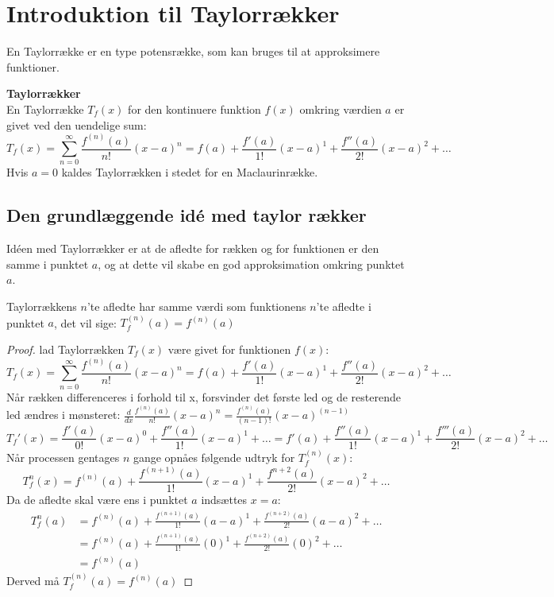 \chapter{Introduktion til Taylorrækker}
\label{ch:tr}
En Taylorrække er en type potensrække, som kan bruges til at approksimere funktioner.
\begin{defn}
    \textbf{Taylorrækker}\\
    En Taylorrække $T_f(x)$ for den kontinuere funktion $f(x)$ omkring værdien $a$ er givet ved den uendelige sum:
    \[
        T_f(x) = \sum^{\infty}_{n=0} \frac{f^{(n)}(a)}{n!} (x-a)^{n}
        = f(a) + \frac{f'(a)}{1!}(x-a)^{1} + \frac{f''(a)}{2!}(x-a)^{2} + \ldots
    \]
    Hvis $a = 0$ kaldes Taylorrækken i stedet for en Maclaurinrække.
\end{defn}
\section{Den grundlæggende idé med taylor rækker}
\label{def:taylorrække} Idéen med Taylorrækker er at de afledte for rækken og for funktionen er den samme i punktet $a$, 
og at dette vil skabe en god approksimation omkring punktet $a$. 
\begin{thm}
    Taylorrækkens $n$'te afledte har samme værdi som funktionens $n$'te afledte i punktet $a$, 
    det vil sige: $T_f^{(n)}(a) = f^{(n)} (a)$
\end{thm}
\begin{proof}
    lad Taylorrækken $T_f(x)$ være givet for funktionen $f(x)$: 
    \[
        T_f(x) = \sum^{\infty}_{n=0} \frac{f^{(n)}(a)}{n!} (x-a)^{n}
        = f(a) + \frac{f'(a)}{1!}(x-a)^{1} + \frac{f''(a)}{2!}(x-a)^{2} + \ldots
    \]
    Når rækken differenceres i forhold til x, forsvinder det første led og de resterende led ændres i mønsteret: $\frac{d}{dx} \frac{f^{(n)}(a)}{n!} (x-a)^{n} = \frac{f^{(n)}(a)}{(n-1)!} (x-a)^{(n - 1)}$ %
    \[
        T_f'(x) = \frac{f'(a)}{0!}(x-a)^0 + \frac{f''(a)}{1!}(x-a)^{1} + \ldots = f'(a) + \frac{f''(a)}{1!}(x-a)^{1} + \frac{f'''(a)}{2!}(x-a)^{2} + \ldots
    \]
    Når processen gentages $n$ gange opnåes følgende udtryk for $T_f^{(n)}(x)$:
    \[
        T_f^{n}(x) = f^{(n)}(a) + \frac{f^{(n + 1)}(a)}{1!}(x-a)^{1} + \frac{f^{n + 2}(a)}{2!}(x-a)^{2} + \ldots
    \]
    Da de afledte skal være ens i punktet $a$ indsættes $x = a$:
    \begin{align*}
        T_f^{n}(a) &= f^{(n)}(a) + \frac{f^{(n + 1)}(a)}{1!}(a-a)^{1} + \frac{f^{(n + 2)}(a)}{2!}(a-a)^{2} + \ldots \\
                   &= f^{(n)}(a) + \frac{f^{(n + 1)}(a)}{1!}(0)^{1} + \frac{f^{(n + 2)}(a)}{2!}(0)^{2} + \ldots \\
                   &= f^{(n)}(a)        
    \end{align*}
    Derved må $T_f^{(n)}(a) = f^{(n)}(a)$
\end{proof}
